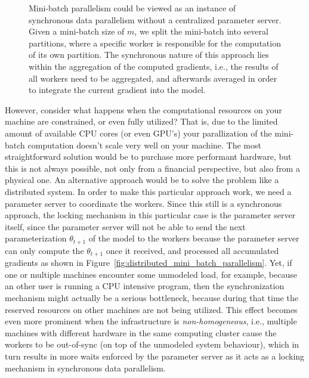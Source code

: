 \begin{figure}[H]
  \caption{Mini-batch parallelism could be viewed as an instance of synchronous data parallelism without a centralized parameter server. Given a mini-batch size of $m$, we split the mini-batch into several partitions, where a specific worker is responsible for the computation of its own partition. The synchronous nature of this approach lies within the aggregation of the computed gradients, i.e., the results of all workers need to be aggregated, and afterwards averaged in order to integrate the current gradient into the model.}
  \label{fig:minibatch_data_parallelism}
\end{figure}

However, consider what happens when the computational resources on your machine are constrained, or even fully utilized? That is, due to the limited amount of available CPU cores (or even GPU's) your parallization of the mini-batch computation doesn't scale very well on your machine. The most straightforward solution would be to purchase more performant hardware, but this is not always possible, not only from a financial perspective, but also from a physical one. An alternative approach would be to solve the problem like a distributed system. In order to make this particular approach work, we need a parameter server to coordinate the workers. Since this still is a synchronous approach, the locking mechanism in this particular case is the parameter server itself, since the parameter server will not be able to send the next parameterization $\theta_{t+1}$ of the model to the workers because the parameter server can only compute the $\theta_{t+1}$ once it received, and processed all accumulated gradients as shown in Figure~\ref{fig:distributed_mini_batch_parallelism}. Yet, if one or multiple machines encounter some unmodeled load, for example, because an other user is running a CPU intensive program, then the synchronization mechanism might actually be a serious bottleneck, because during that time the reserved resources on other machines are not being utilized. This effect becomes even more prominent when the infrastructure is \emph{non-homogeneous}, i.e., multiple machines with different hardware in the same computing cluster cause the workers to be out-of-sync (on top of the unmodeled system behaviour), which in turn results in more waits enforced by the parameter server as it acts as a locking mechanism in synchronous data parallelism.

